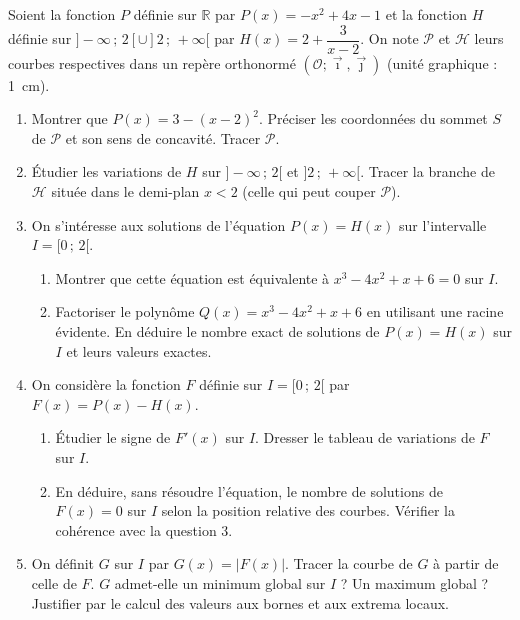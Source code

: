 \documentclass[11pt]{article}
\begin{document}
\begin{exercice}
Soient la fonction $P$ définie sur $\mathbb{R}$ par $P(x) = -x^2 + 4x - 1$ et la fonction $H$ définie sur $]-\infty\,;\, 2[ \cup ]2\,;\, +\infty[$ par $H(x) = 2 + \dfrac{3}{x-2}$.
On note $\mathcal{P}$ et $\mathcal{H}$ leurs courbes respectives dans un repère orthonormé $(\mathcal{O}; \vec{\imath}, \vec{\jmath})$ (unité graphique : \SI{1}{cm}).
\begin{enumerate}
    \item Montrer que $P(x) = 3 - (x-2)^2$. Préciser les coordonnées du sommet $S$ de $\mathcal{P}$ et son sens de concavité. Tracer $\mathcal{P}$.
    \item Étudier les variations de $H$ sur $]-\infty\,;\, 2[$ et $]2\,;\, +\infty[$. Tracer la branche de $\mathcal{H}$ située dans le demi-plan $x < 2$ (celle qui peut couper $\mathcal{P}$).
    \item On s'intéresse aux solutions de l'équation $P(x) = H(x)$ sur l'intervalle $I = [0\,;\, 2[$.
    \begin{enumerate}
        \item Montrer que cette équation est équivalente à $x^3 - 4x^2 + x + 6 = 0$ sur $I$.
        \item Factoriser le polynôme $Q(x) = x^3 - 4x^2 + x + 6$ en utilisant une racine évidente. En déduire le nombre exact de solutions de $P(x)=H(x)$ sur $I$ et leurs valeurs exactes.
    \end{enumerate}
    \item On considère la fonction $F$ définie sur $I = [0\,;\, 2[$ par $F(x) = P(x) - H(x)$.
    \begin{enumerate}
        \item Étudier le signe de $F'(x)$ sur $I$. Dresser le tableau de variations de $F$ sur $I$.
        \item En déduire, sans résoudre l'équation, le nombre de solutions de $F(x) = 0$ sur $I$ selon la position relative des courbes. Vérifier la cohérence avec la question 3.
    \end{enumerate}
    \item On définit $G$ sur $I$ par $G(x) = |F(x)|$. Tracer la courbe de $G$ à partir de celle de $F$. $G$ admet-elle un minimum global sur $I$ ? Un maximum global ? Justifier par le calcul des valeurs aux bornes et aux extrema locaux.
\end{enumerate}
\end{exercice}
\end{document}
